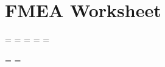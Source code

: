 \documentclass [10pt]{article}
\begin{document}





\section{FMEA Worksheet}


%




\newpage
\pagestyle{fancy}

\paperwidth=\pdfpageheight
\paperheight=\pdfpagewidth
\pdfpageheight=\paperheight
\pdfpagewidth=\paperwidth
\headwidth=\textheight


\begingroup

\vsize=\textwidth
\hsize=\textheight
\end{document}
